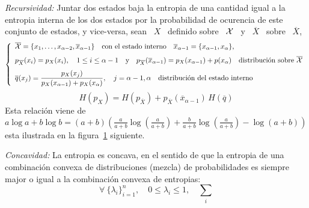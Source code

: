 \begin{propiedades}
%
\item\label{prop:SZ:recursividad} {\it Recursividad:} Juntar dos estados baja la
  entropia de una cantidad igual a la entropia interna de los dos estados por la
  probabilidad de ocurencia de este  conjunto de estados, y vice-versa, \ie sean
  \ $X$ \ definido sobre \ $\mathcal{X}$ \ y \ $\overline{X}$ \ sobre \ $\overline{X}$,
  \[
  \left\{  \begin{array}{l}\overline{\mathcal{X}} =  \{  x_1 ,  \ldots  , x_{\alpha-2}  ,
      \overline{x}_{\alpha-1}\}  \quad   \mbox{con  el  estado   interno}  \quad
      \overline{x}_{\alpha-1}   =  \{   x_{\alpha-1}  ,   x_\alpha  \},\\[2.5mm]
      p_{\overline{X}}(x_i)  = p_X(x_i),  \quad 1  \le i  \le \alpha-1  \quad \mbox{y}
      \quad p_{\overline{X}}(\overline{x}_{\alpha-1}) = p_X(x_{\alpha-1}) +
      p(x_\alpha)  \quad  \mbox{distribuci\'on  sobre  }  \overline{\mathcal{X}}\\[2.5mm]
      \displaystyle   \overline{q}(x_j)    =   \frac{p_X(x_j)}{p_X(x_{\alpha-1})   +
        p_X(x_\alpha)}, \quad j =  \alpha-1, \alpha \quad \mbox{distribuci\'on del
        estado   interno}\end{array}\right.
  \]
  \[
  H(p_X)  = H(p_{\overline{X}})  +  p_{\overline{X}}(\overline{x}_{\alpha-1}) \,
  H(\overline{q})
  \]
  Esta relaci\'on  viene de $a \log  a + b  \log b = (a+b)  \left( \frac{a}{a+b}
    \log\left(  \frac{a}{a+b} \right)  + \frac{b}{a+b}  \log\left( \frac{a}{a+b}
    \right)   -    \log(   a    +   b   )\right)$    esta   ilustrada    en   la
  figura~\ref{fig:SZ:Recursividad} siguiente.\newline
  \begin{figure}[h!]
  \begin{center}  \end{center}
  \label{fig:SZ:Recursividad}
  \end{figure}
%
\item\label{prop:SZ:concavidad} {\it Concavidad:} La  entropia es concava, en el
  sentido  de que  la entropia  de una  combinaci\'on convexa  de distribuciones
  (mezcla) de probabilidades es siempre major o igual a la combinaci\'on convexa
  de entropias:
  \[
  \forall \: \{ \lambda_i \}_{i=1}^n, \quad  0 \le \lambda_i \le 1, \quad \sum_i
\]
\end{propiedades}

